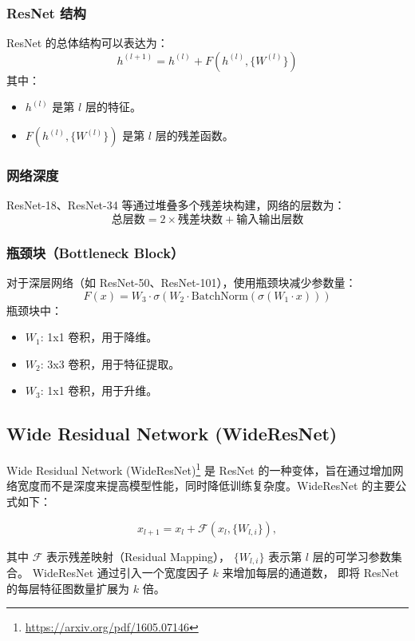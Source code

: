 \documentclass[12pt, a4paper, oneside]{ctexart}
\numberwithin{equation}{section}  %
\begin{document}
\subsubsection{ResNet 结构}
ResNet 的总体结构可以表达为：
\[
h^{(l+1)} = h^{(l)} + F(h^{(l)}, \{W^{(l)}\})
\]
其中：
\begin{itemize}
    \item $h^{(l)}$ 是第 $l$ 层的特征。
    \item $F(h^{(l)}, \{W^{(l)}\})$ 是第 $l$ 层的残差函数。
\end{itemize}

\subsubsection{网络深度}
ResNet-18、ResNet-34 等通过堆叠多个残差块构建，网络的层数为：
\[
\text{总层数} = 2 \times \text{残差块数} + \text{输入输出层数}
\]

\subsubsection{瓶颈块（Bottleneck Block）}
对于深层网络（如 ResNet-50、ResNet-101），使用瓶颈块减少参数量：
\[
F(x) = W_3 \cdot \sigma(W_2 \cdot \text{BatchNorm}(\sigma(W_1 \cdot x)))
\]
瓶颈块中：
\begin{itemize}
    \item $W_1$: 1x1 卷积，用于降维。
    \item $W_2$: 3x3 卷积，用于特征提取。
    \item $W_3$: 1x1 卷积，用于升维。
\end{itemize}

\subsection{Wide Residual Network (WideResNet)}

Wide Residual Network (WideResNet)\footnote{\url{https://arxiv.org/pdf/1605.07146}} 
是 ResNet 的一种变体，旨在通过增加网络宽度而不是深度来提高模型性能，同时降低训练复杂度。WideResNet 的主要公式如下：

\begin{equation}
x_{l+1} = x_l + \mathcal{F}(x_l, \{W_{l,i}\}),
\end{equation}

其中 $\mathcal{F}$ 表示残差映射（Residual Mapping），
$\{W_{l,i}\}$ 表示第 $l$ 层的可学习参数集合。
WideResNet 通过引入一个宽度因子 $k$ 来增加每层的通道数，
即将 ResNet 的每层特征图数量扩展为 $k$ 倍。
\end{document}
